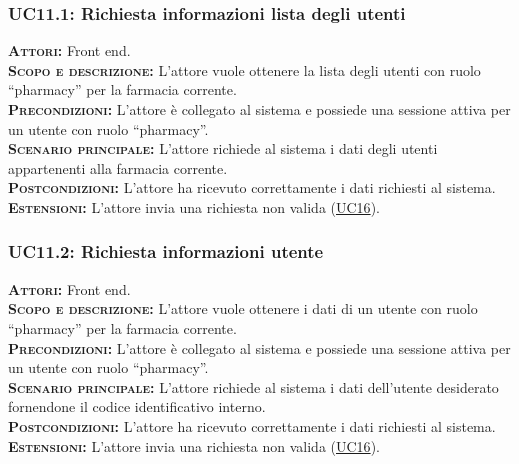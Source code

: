 \subsubsection{UC11.1: Richiesta informazioni lista degli utenti}
\label{sec:UC111}
\textsc{\textbf{Attori:}} Front end.\\
\textsc{\textbf{Scopo e descrizione:}} L'attore vuole ottenere la lista degli utenti con ruolo ``pharmacy'' per la farmacia corrente.\\
\textsc{\textsc{\textbf{Precondizioni:}}} L'attore è collegato al sistema e possiede una sessione attiva per un utente con ruolo ``pharmacy''.\\
\textsc{\textbf{Scenario principale:}} L'attore richiede al sistema i dati degli utenti appartenenti alla farmacia corrente.\\
\textsc{\textbf{Postcondizioni:}} L'attore ha ricevuto correttamente i dati richiesti al sistema.\\
\textsc{\textbf{Estensioni:}} L'attore invia una richiesta non valida (\hyperref[sec:UC16]{UC16}).

\subsubsection{UC11.2: Richiesta informazioni utente}
\label{sec:UC112}
\textsc{\textbf{Attori:}} Front end.\\
\textsc{\textbf{Scopo e descrizione:}} L'attore vuole ottenere i dati di un utente con ruolo ``pharmacy'' per la farmacia corrente.\\
\textsc{\textsc{\textbf{Precondizioni:}}} L'attore è collegato al sistema e possiede una sessione attiva per un utente con ruolo ``pharmacy''.\\
\textsc{\textbf{Scenario principale:}} L'attore richiede al sistema i dati dell'utente desiderato fornendone il codice identificativo interno.\\
\textsc{\textbf{Postcondizioni:}} L'attore ha ricevuto correttamente i dati richiesti al sistema.\\
\textsc{\textbf{Estensioni:}} L'attore invia una richiesta non valida (\hyperref[sec:UC16]{UC16}).

